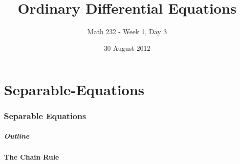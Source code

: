 \part{Separable-Equations}
\section{Separable Equations}


\title{Ordinary Differential Equations}
\subtitle{Math 232 - Week 1, Day 3}
\date{30 August 2012}

\begin{frame}
  \titlepage
\end{frame}

\begin{frame}
  \frametitle{Outline}
\end{frame}


\subsection{The Chain Rule}
%
    

%
%

%
%
%
%

